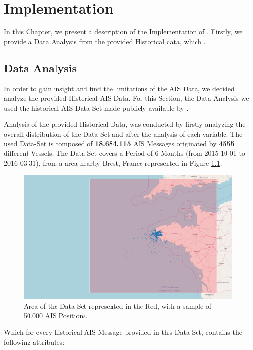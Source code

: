 \chapter{Implementation}
\label{chapter:Chapter 4}

In this Chapter, we present a description of the Implementation of . Firstly, we provide a Data Analysis from the provided Historical data, which .

\section{Data Analysis}
In order to gain insight and find the limitations of the AIS Data, we decided analyze the provided Historical AIS Data. For this Section, the Data Analysis we used the historical AIS Data-Set made publicly available by \cite{DATASET}.

Analysis of the provided Historical Data, was conducted by firstly analyzing the overall distribution of the Data-Set and after the analysis of each variable. 
The used Data-Set is composed of \textbf{18.684.115} AIS Messages originated by \textbf{4555} different Vessels. The Data-Set covers a Period of 6 Months (from 2015-10-01 to 2016-03-31), from a area nearby Brest, France represented in Figure \ref{fig:DS_Sample}.

\begin{figure}[H]
	\centering
	\includegraphics[scale = .23]{figures/Ch4/nari_DS_ex2.png}
    \caption{Area of the Data-Set represented in the Red, with a sample of 50.000 AIS Positions.}
    \label{fig:DS_Sample}
\end{figure}
Which for every  historical AIS Message provided in this Data-Set, contains the following attributes:


